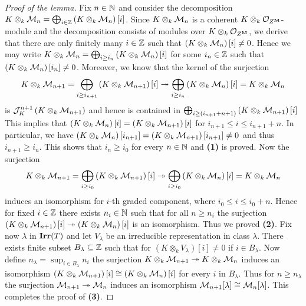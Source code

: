 \begin{proof}[Proof of the lemma]
Fix $n\in {\mathbb N}$ and consider the decomposition $K\otimes_k{\mathcal M}_n = \bigoplus_{i\in {\mathbb Z}}\left(K\otimes_k{\mathcal M}_n\right)[i]$. Since $K\otimes_k{\mathcal M}_n$ is a coherent $K\otimes_k {\mathcal O}_{Z^{\mathbf{M}}}$-module and the decomposition consists of modules over $K\otimes_k{\mathcal O}_{Z^{\mathbf{M}}}$, we derive that there are only finitely many $i\in {\mathbb Z}$ such that $\left(K\otimes_k{\mathcal M}_n\right)[i]\neq 0$. Hence we may write $K\otimes_k{\mathcal M}_n = \bigoplus_{i\geq i_n}\left(K\otimes_k{\mathcal M}_n\right)[i]$ for some $i_n\in {\mathbb Z}$ such that $\left(K\otimes_k{\mathcal M}_n\right)[i_n] \neq 0$. Moreover, we know that the kernel of the surjection
$$K\otimes_k{\mathcal M}_{n+1} = \bigoplus_{i\geq i_{n+1}}\left(K\otimes_k{\mathcal M}_{n+1}\right)[i] \twoheadrightarrow \bigoplus_{i\geq i_n}\left(K\otimes_k{\mathcal M}_n\right)[i] = K\otimes_k{\mathcal M}_n$$
is ${\mathcal J}_K^{n+1}\left(K\otimes_k{\mathcal M}_{n+1}\right)$ and hence is contained in $\bigoplus_{i\geq (i_{n+1}+n+1)}\left(K\otimes_k{\mathcal M}_{n+1}\right)[i]$
This implies that $\left(K\otimes_k{\mathcal M}_{n}\right)[i]  = \left(K\otimes_k{\mathcal M}_{n+1}\right)[i]$ for $i_{n+1}\leq i \leq i_{n+1}+n$. In particular, we have $\left(K\otimes_k{\mathcal M}_{n}\right)[i_{n+1}]  = \left(K\otimes_k{\mathcal M}_{n+1}\right)[i_{n+1}] \neq 0$ and thus $i_{n+1} \geq i_n$. This shows that $i_n\geq i_0$ for every $n\in {\mathbb N}$ and \textbf{(1)} is proved. Now the surjection
$$K\otimes_k{\mathcal M}_{n+1} = \bigoplus_{i\geq i_{0}}\left(K\otimes_k{\mathcal M}_{n+1}\right)[i] \twoheadrightarrow \bigoplus_{i\geq i_0}\left(K\otimes_k{\mathcal M}_n\right)[i] = K\otimes_k{\mathcal M}_n$$
induces an isomorphism for $i$-th graded component, where $i_0 \leq i\leq i_0+n$. Hence for fixed $i\in {\mathbb Z}$ there exists $n_i\in {\mathbb N}$ such that for all $n\geq n_i$ the surjection $\left(K\otimes_k{\mathcal M}_{n+1}\right)[i] \twoheadrightarrow \left(K\otimes_k{\mathcal M}_n\right)[i]$ is an isomorphism. Thus we proved \textbf{(2)}. Fix now $\lambda$ in $\mathbf{Irr}(T)$ and let $V_{\lambda}$ be an irreducible representation in class $\lambda$. There exists finite subset $B_{\lambda}\subseteq {\mathbb Z}$ such that for $\left(K\otimes_kV_{\lambda}\right)[i] \neq 0$ if $i\in B_{\lambda}$. Now define $n_{\lambda} = \sup_{i\in B_{\lambda}}n_i$ the surjection $K\otimes_k{\mathcal M}_{n+1}\twoheadrightarrow K\otimes_k{\mathcal M}_n$ induces an isomorphism $\left(K\otimes_k{\mathcal M}_{n+1}\right)[i] \cong \left(K\otimes_k{\mathcal M}_n\right)[i]$ for every $i$ in $B_{\lambda}$. Thus for $n\geq n_{\lambda}$ the surjection ${\mathcal M}_{n+1}\twoheadrightarrow {\mathcal M}_n$ induces an isomorphism ${\mathcal M}_{n+1}[\lambda]\cong {\mathcal M}_n[\lambda]$. This completes the proof of \textbf{(3)}.
\end{proof}

